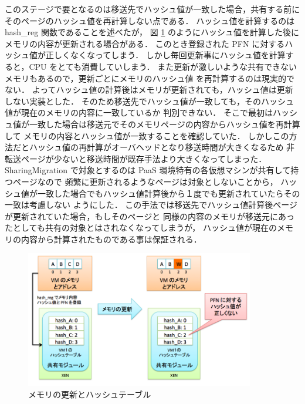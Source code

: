 \documentclass[graduation-thesis]{mlarticle}
\begin{document}
このステージで要となるのは移送先でハッシュ値が一致した場合，共有する前に
そのページのハッシュ値を再計算しない点である．
ハッシュ値を計算するのは hash\_reg 関数であることを述べたが，
図 \ref{non-renewal} のようにハッシュ値を計算した後にメモリの内容が更新される場合がある．
このとき登録された PFN に対するハッシュ値が正しくなくなってしまう．
しかし毎回更新事にハッシュ値を計算すると，CPU をとても消費していしまう．
また更新が激しいような共有できないメモリもあるので，更新ごとにメモリのハッシュ値
を再計算するのは現実的でない．
よってハッシュ値の計算後はメモリが更新されても，ハッシュ値は更新しない実装とした．
そのため移送先でハッシュ値が一致しても，そのハッシュ値が現在のメモリの内容に一致しているか
判別できない．
そこで最初はハッシュ値が一致した場合は移送元でそのメモリページの内容からハッシュ値を再計算して
メモリの内容とハッシュ値が一致することを確認していた．
しかしこの方法だとハッシュ値の再計算がオーバヘッドとなり移送時間が大きくなるため
非転送ページが少ないと移送時間が既存手法より大きくなってしまった．
SharingMigration で対象とするのは PaaS 環境特有の各仮想マシンが共有して持つページなので
頻繁に更新されるようなページは対象としないことから，
ハッシュ値が一致した場合でもハッシュ値計算後から１度でも更新されていたらその一致は考慮しない
ようにした．
この手法では移送先でハッシュ値計算後ページが更新されていた場合，もしそのページと
同様の内容のメモリが移送元にあったとしても共有の対象とはされなくなってしまうが，
ハッシュ値が現在のメモリの内容から計算されたものである事は保証される．

\begin{figure}[H]\begin{center}\includegraphics[width=10.0cm]{./img/non-renewal.png}\caption{ メモリの更新とハッシュテーブル}\label{non-renewal}\end{center}\end{figure}
\end{document}
